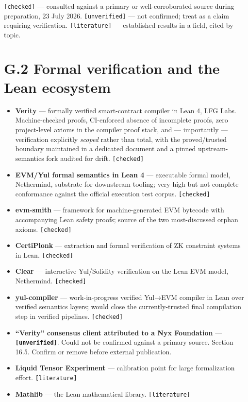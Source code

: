\documentclass[
  11pt]{report}
\providecommand{\tightlist}{%
  \setlength{\itemsep}{0pt}\setlength{\parskip}{0pt}}
\begin{document}
\texttt{{[}checked{]}} --- consulted against a primary or
well-corroborated source during preparation, 23 July 2026.
\texttt{{[}unverified{]}} --- not confirmed; treat as a claim requiring
verification. \texttt{{[}literature{]}} --- established results in a
field, cited by topic.

\hypertarget{g.2-formal-verification-and-the-lean-ecosystem}{%
\section{G.2 Formal verification and the Lean
ecosystem}\label{g.2-formal-verification-and-the-lean-ecosystem}}

\begin{itemize}
\tightlist
\item
  \textbf{Verity} --- formally verified smart-contract compiler in Lean
  4, LFG Labs. Machine-checked proofs, CI-enforced absence of incomplete
  proofs, zero project-level axioms in the compiler proof stack, and ---
  importantly --- verification explicitly \emph{scoped} rather than
  total, with the proved/trusted boundary maintained in a dedicated
  document and a pinned upstream-semantics fork audited for drift.
  \texttt{{[}checked{]}}
\item
  \textbf{EVM/Yul formal semantics in Lean 4} --- executable formal
  model, Nethermind, substrate for downstream tooling; very high but not
  complete conformance against the official execution test corpus.
  \texttt{{[}checked{]}}
\item
  \textbf{evm-smith} --- framework for machine-generated EVM bytecode
  with accompanying Lean safety proofs; source of the two most-discussed
  orphan axioms. \texttt{{[}checked{]}}
\item
  \textbf{CertiPlonk} --- extraction and formal verification of ZK
  constraint systems in Lean. \texttt{{[}checked{]}}
\item
  \textbf{Clear} --- interactive Yul/Solidity verification on the Lean
  EVM model, Nethermind. \texttt{{[}checked{]}}
\item
  \textbf{yul-compiler} --- work-in-progress verified Yul→EVM compiler
  in Lean over verified semantics layers; would close the
  currently-trusted final compilation step in verified pipelines.
  \texttt{{[}checked{]}}
\item
  \textbf{``Verity'' consensus client attributed to a Nyx Foundation}
  --- \textbf{\texttt{{[}unverified{]}}}. Could not be confirmed against
  a primary source. Section 16.5. Confirm or remove before external
  publication.
\item
  \textbf{Liquid Tensor Experiment} --- calibration point for large
  formalization effort. \texttt{{[}literature{]}}
\item
  \textbf{Mathlib} --- the Lean mathematical library.
  \texttt{{[}literature{]}}
\end{itemize}
\end{document}
